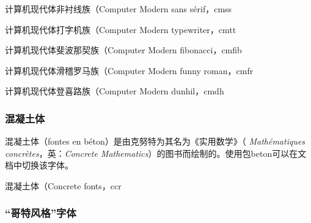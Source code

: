   \begin{decritfonte}{计算机现代体非衬线族（Computer Modern sans sérif，}{cmss}
  \end{decritfonte}
  
  \begin{decritfonte}{计算机现代体打字机族（Computer Modern typewriter，}{cmtt}
  \end{decritfonte}
  
  \begin{decritfonte}{计算机现代体斐波那契族（Computer Modern fibonacci，}{cmfib}
  \end{decritfonte}
  
  \begin{decritfonte}{计算机现代体滑稽罗马族（Computer Modern funny roman，}{cmfr}
  \end{decritfonte}
  
  \begin{decritfonte}{计算机现代体登喜路族（Computer Modern dunhil，}{cmdh}
  \end{decritfonte}

\subsubsection{混凝土体}

{\selectfont 混凝土体（fontes en béton）是由克努特为其名为《实用数学》（ \emph{Mathématiques concrètes}，英：\emph{Concrete Mathematics}}）的图书而绘制的。使用包\textsf{beton}可以在文档中切换该字体。

\begin{decritfonte}[T1]{混凝土体（Concrete fonts，}{ccr}
\end{decritfonte}

\subsubsection{“哥特风格”字体}

